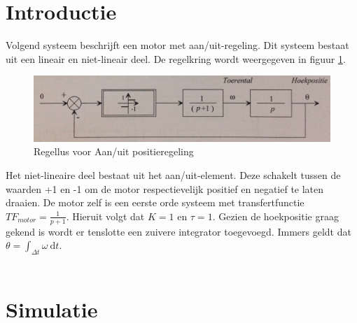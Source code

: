 \documentclass[12pt]{article}
\begin{document}
\section{Introductie}
Volgend systeem beschrijft een motor met aan/uit-regeling. Dit systeem bestaat uit een lineair en niet-lineair deel. De regelkring wordt weergegeven in figuur \ref{regellus}.
\begin{figure}[!h]
	\centering
	\includegraphics[width=\textwidth, keepaspectratio]{regellus.png}
	\caption{Regellus voor Aan/uit positieregeling}
	\label{regellus}	
\end{figure}

\noindent
Het niet-lineaire deel bestaat uit het aan/uit-element. Deze schakelt tussen de waarden +1 en -1 om de motor respectievelijk positief en negatief te laten draaien. De motor zelf is een eerste orde systeem met transfertfunctie $TF_{motor} = \frac{1}{p+1}$. Hieruit volgt dat $K=1$ en $\tau=1$. Gezien de hoekpositie graag gekend is wordt er tenslotte een zuivere integrator toegevoegd. Immers geldt dat $\theta = \int_{\Delta t} \omega \ \mathrm{d}t$. \\ \\
\section{Simulatie}
\end{document}
